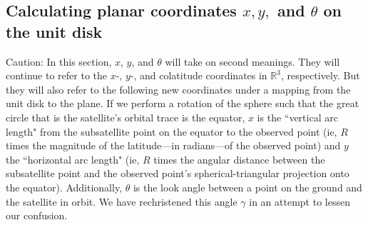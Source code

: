 \documentclass{article}
\begin{document}



\subsection{Calculating planar coordinates $x, y,$ and $ \theta$ on the unit disk}
Caution: In this section, $x$, $y$, and $\theta$ will take on second meanings. They will continue to refer to the $x$-, $y$-, and colatitude coordinates in $\mathbb{R}^3$, respectively. But they will also refer to the following new coordinates under a mapping from the unit disk to the plane. If we perform a rotation of the sphere such that the great circle that is the satellite's orbital trace is the equator, $x$ is the ``vertical arc length" from the subsatellite point on the equator to the observed point (ie, $R$ times the magnitude of the latitude---in radians---of the observed point) and $y$ the ``horizontal arc length" (ie, $R$ times the angular distance between the subsatellite point and the observed point's spherical-triangular projection onto the equator). Additionally, $\theta$ is the look angle between a point on the ground and the satellite in orbit. We have rechristened this angle $\gamma$ in an attempt to lessen our confusion.
\end{document}
